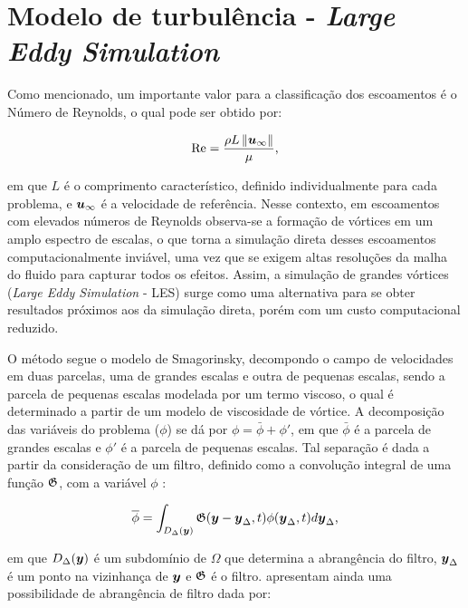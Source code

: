 \section{Modelo de turbulência - \textit{Large Eddy Simulation}} \label{LES}

Como mencionado, um importante valor para a classificação dos escoamentos é o Número de Reynolds, o qual pode ser obtido por:

\begin{equation}
    \mathrm{Re}=\frac{\rho L\left\lVert{\boldsymbol{u}_\infty}\right\lVert}{\mu}\text{,}
    \label{eq:Reynolds}
\end{equation}

\noindent em que $L$ é o comprimento característico, definido individualmente para cada problema, e $\boldsymbol{u}_\infty$ é a velocidade de referência. Nesse contexto, em escoamentos com elevados números de Reynolds observa-se a formação de vórtices em um amplo espectro de escalas, o que torna a simulação direta desses escoamentos computacionalmente inviável, uma vez que se exigem altas resoluções da malha do fluido para capturar todos os efeitos. Assim, a simulação de grandes vórtices (\textit{Large Eddy Simulation} - LES) surge como uma alternativa para se obter resultados próximos aos da simulação direta, porém com um custo computacional reduzido.

O método segue o modelo de Smagorinsky, decompondo o campo de velocidades em duas parcelas, uma de grandes escalas e outra de pequenas escalas, sendo a parcela de pequenas escalas modelada por um termo viscoso, o qual é determinado a partir de um modelo de viscosidade de vórtice. A decomposição das variáveis do problema ($\phi$) se dá por $\phi=\bar{\phi}+\phi'$, em que $\bar{\phi}$ é a parcela de grandes escalas e $\phi'$ é a parcela de pequenas escalas. Tal separação é dada a partir da consideração de um filtro, definido como a convolução integral de uma função $\mathfrak{G}$, com a variável $\phi$ \cite{germano1991dynamic,hughes2000large,moeng2015large,katopodes2019free}:

\begin{equation}
    \overline{\phi}=\int_{D_\Delta(\boldsymbol{y})}{\mathfrak{G}(\boldsymbol{y}-\boldsymbol{y}_\Delta,t)\phi(\boldsymbol{y}_\Delta,t)d\boldsymbol{y}_\Delta}\text{,}
\end{equation}

\noindent em que $D_\Delta(\boldsymbol{y})$ é um subdomínio de $\Omega$ que determina a abrangência do filtro, $\boldsymbol{y}_\Delta$ é um ponto na vizinhança de $\boldsymbol{y}$ e $\mathfrak{G}$ é o filtro.  apresentam ainda uma possibilidade de abrangência de filtro dada por:

